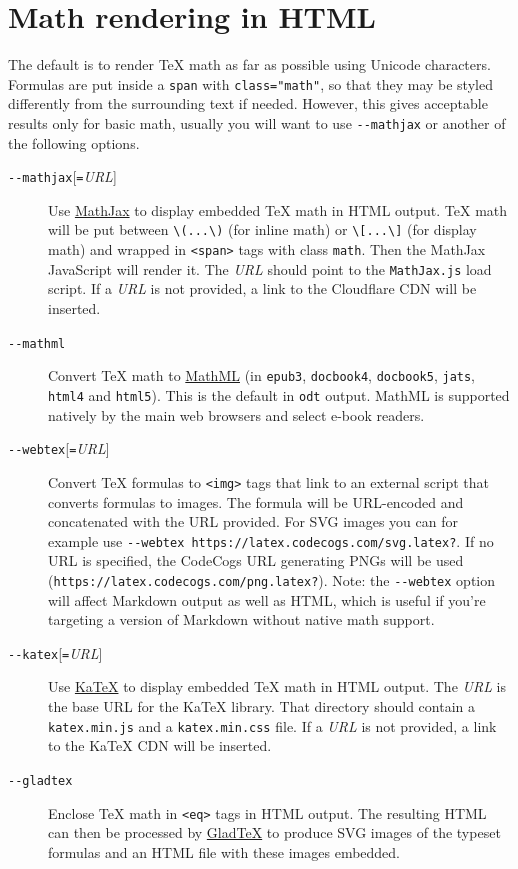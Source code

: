 \documentclass[
  b5paper
]{book}
\begin{document}
\section{Math rendering in HTML}\label{math-rendering-in-html}

The default is to render TeX math as far as possible using Unicode
characters. Formulas are put inside a \texttt{span} with
\texttt{class="math"}, so that they may be styled differently from the
surrounding text if needed. However, this gives acceptable results only
for basic math, usually you will want to use \texttt{-\/-mathjax} or
another of the following options.

\begin{description}
\item[\texttt{-\/-mathjax}{[}\texttt{=}\emph{URL}{]}]
Use \href{https://www.mathjax.org}{MathJax} to display embedded TeX math
in HTML output. TeX math will be put between
\texttt{\textbackslash{}(...\textbackslash{})} (for inline math) or
\texttt{\textbackslash{}{[}...\textbackslash{}{]}} (for display math)
and wrapped in \texttt{\textless{}span\textgreater{}} tags with class
\texttt{math}. Then the MathJax JavaScript will render it. The
\emph{URL} should point to the \texttt{MathJax.js} load script. If a
\emph{URL} is not provided, a link to the Cloudflare CDN will be
inserted.
\item[\texttt{-\/-mathml}]
Convert TeX math to \href{https://www.w3.org/Math/}{MathML} (in
\texttt{epub3}, \texttt{docbook4}, \texttt{docbook5}, \texttt{jats},
\texttt{html4} and \texttt{html5}). This is the default in \texttt{odt}
output. MathML is supported natively by the main web browsers and select
e-book readers.
\item[\texttt{-\/-webtex}{[}\texttt{=}\emph{URL}{]}]
Convert TeX formulas to \texttt{\textless{}img\textgreater{}} tags that
link to an external script that converts formulas to images. The formula
will be URL-encoded and concatenated with the URL provided. For SVG
images you can for example use
\texttt{-\/-webtex\ https://latex.codecogs.com/svg.latex?}. If no URL is
specified, the CodeCogs URL generating PNGs will be used
(\texttt{https://latex.codecogs.com/png.latex?}). Note: the
\texttt{-\/-webtex} option will affect Markdown output as well as HTML,
which is useful if you're targeting a version of Markdown without native
math support.
\item[\texttt{-\/-katex}{[}\texttt{=}\emph{URL}{]}]
Use \href{https://github.com/Khan/KaTeX}{KaTeX} to display embedded TeX
math in HTML output. The \emph{URL} is the base URL for the KaTeX
library. That directory should contain a \texttt{katex.min.js} and a
\texttt{katex.min.css} file. If a \emph{URL} is not provided, a link to
the KaTeX CDN will be inserted.
\item[\texttt{-\/-gladtex}]
Enclose TeX math in \texttt{\textless{}eq\textgreater{}} tags in HTML
output. The resulting HTML can then be processed by
\href{https://humenda.github.io/GladTeX/}{GladTeX} to produce SVG images
of the typeset formulas and an HTML file with these images embedded.


\end{description}
\end{document}
